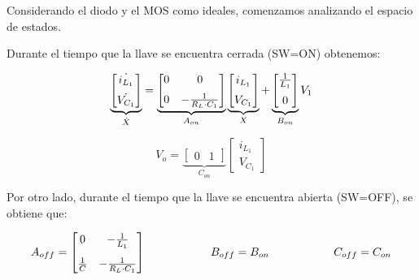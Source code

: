 \documentclass[e4_tp2_main.tex]{subfiles}
\begin{document}
Considerando el diodo y el MOS como ideales, comenzamos analizando el espacio de estados. 

Durante el tiempo que la llave se encuentra cerrada (SW=ON) obtenemos:

\begin{equation}
\underbrace{
\begin{bmatrix}
\dot{i_{L_1}} \vspace{0.2cm} \\
\dot{V_{C_1}} 
\end{bmatrix}
}_{\dot{X}}
=
\underbrace{
\begin{bmatrix}
{0} & {0} \vspace{0.2cm}\\
{0} & {-\frac{1}{R_L \cdot C_1}} 
\end{bmatrix}
}_{A_{on}}
\underbrace{
\begin{bmatrix}
{i_{L_1}} \vspace{0.2cm}\\
{V_{C_1}} 
\end{bmatrix}
}_{X}
+
\underbrace{
\begin{bmatrix}
{\frac{1}{L_1}} \vspace{0.2cm}\\
{0} 
\end{bmatrix}
}_{B_{on}}
V_1
\end{equation}


\begin{equation}
V_o =
\underbrace{
\begin{bmatrix}
{0} & {1} 
\end{bmatrix}
}_{C_{on}}
\begin{bmatrix}
{i_{L_1}} \\
{V_{C_1}} 
\end{bmatrix}
\end{equation}

Por otro lado, durante el tiempo que la llave se encuentra abierta (SW=OFF), se obtiene que: 

\begin{equation}
A_{off} = 
\begin{bmatrix}
{0} & {- \frac{1}{L_1}} \vspace{0.3cm}\\ 
{\frac{1}{C}} & {-\frac{1}{R_L \cdot C_1}}
\end{bmatrix}  
\hspace{2cm} B_{off}=B_{on}  
\hspace{2cm} C_{off} = C_{on}
\end{equation}
\end{document}
